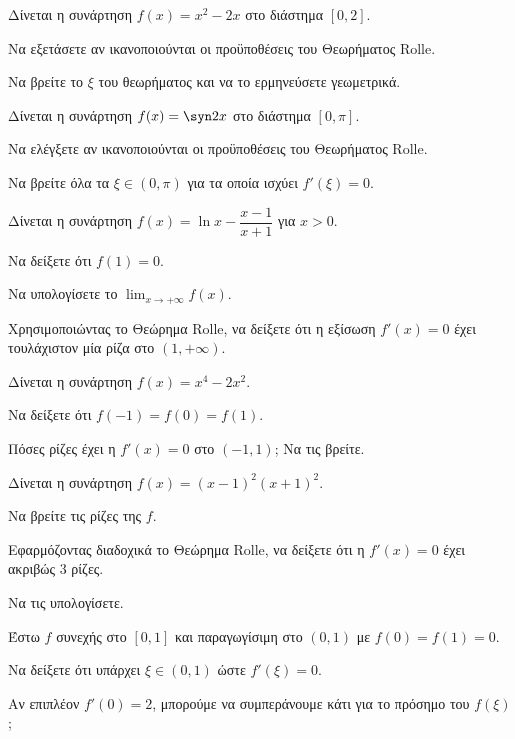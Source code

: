 \documentclass[11pt,a4paper,modern]{FFExercises}
\begin{document}
\askhsh
Δίνεται η συνάρτηση $f(x) = x^2 - 2x$ στο διάστημα $[0, 2]$.
\begin{alist}
  \item Να εξετάσετε αν ικανοποιούνται οι προϋποθέσεις του Θεωρήματος Rolle.
  \item Να βρείτε το $\xi$ του θεωρήματος και να το ερμηνεύσετε γεωμετρικά.
\end{alist}

\askhsh
Δίνεται η συνάρτηση $f(x) = \syn 2x$ στο διάστημα $\left[0, \pi\right]$.
\begin{alist}
  \item Να ελέγξετε αν ικανοποιούνται οι προϋποθέσεις του Θεωρήματος Rolle.
  \item Να βρείτε όλα τα $\xi \in (0, \pi)$ για τα οποία ισχύει $f'(\xi) = 0$.
\end{alist}

\askhsh
Δίνεται η συνάρτηση $f(x) = \ln x - \dfrac{x-1}{x+1}$ για $x > 0$.
\begin{alist}
  \item Να δείξετε ότι $f(1) = 0$.
  \item Να υπολογίσετε το $\displaystyle\lim_{x \to +\infty} f(x)$.
  \item Χρησιμοποιώντας το Θεώρημα Rolle, να δείξετε ότι η εξίσωση $f'(x) = 0$ έχει τουλάχιστον μία ρίζα στο $(1, +\infty)$.
\end{alist}

\askhsh
Δίνεται η συνάρτηση $f(x) = x^4 - 2x^2$.
\begin{alist}
  \item Να δείξετε ότι $f(-1) = f(0) = f(1)$.
  \item Πόσες ρίζες έχει η $f'(x) = 0$ στο $(-1, 1)$; Να τις βρείτε.
\end{alist}

\askhsh
Δίνεται η συνάρτηση $f(x) = (x-1)^2(x+1)^2$.
\begin{alist}
  \item Να βρείτε τις ρίζες της $f$.
  \item Εφαρμόζοντας διαδοχικά το Θεώρημα Rolle, να δείξετε ότι η $f'(x) = 0$ έχει ακριβώς 3 ρίζες.
  \item Να τις υπολογίσετε.
\end{alist}


\askhsh
Έστω $f$ συνεχής στο $[0, 1]$ και παραγωγίσιμη στο $(0, 1)$ με $f(0) = f(1) = 0$.
\begin{alist}
  \item Να δείξετε ότι υπάρχει $\xi \in (0, 1)$ ώστε $f'(\xi) = 0$.
  \item Αν επιπλέον $f'(0) = 2$, μπορούμε να συμπεράνουμε κάτι για το πρόσημο του $f(\xi)$;
\end{alist}
\end{document}
